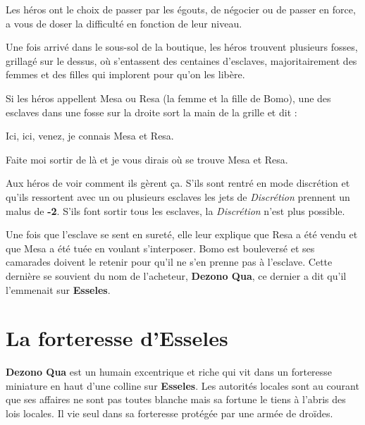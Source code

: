 \documentclass{jdrp}
\begin{document}
	Les héros ont le choix de passer par les égouts, de négocier ou de passer en force, a vous de doser la difficulté en fonction de leur niveau.

	Une fois arrivé dans le sous-sol de la boutique, les héros trouvent plusieurs fosses, grillagé sur le dessus, où s’entassent des centaines d’esclaves, majoritairement des femmes et des filles qui implorent pour qu'on les libère.

	Si les héros appellent Mesa ou Resa (la femme et la fille de Bomo), une des esclaves dans une fosse sur la droite sort la main de la grille et dit :

	\begin{quotebox}
    	Ici, ici, venez, je connais Mesa et Resa.

    	Faite moi sortir de là et je vous dirais où se trouve Mesa et Resa.
	\end{quotebox}
	Aux héros de voir comment ils gèrent ça. S’ils sont rentré en mode discrétion et qu’ils ressortent avec un ou plusieurs esclaves les jets de \textit{Discrétion} prennent un malus de \textbf{-2}. S’ils font sortir tous les esclaves, la \textit{Discrétion} n’est plus possible.

	Une fois que l’esclave se sent en sureté, elle leur explique que Resa a été vendu et que Mesa a été tuée en voulant s’interposer. Bomo est bouleversé et ses camarades doivent le retenir pour qu’il ne s’en prenne pas à l’esclave. Cette dernière se souvient du nom de l’acheteur, \textbf{Dezono Qua}, ce dernier a dit qu’il l’emmenait sur \textbf{Esseles}.

	\section{La forteresse d’Esseles}
	\textbf{Dezono Qua} est un humain excentrique et riche qui vit dans un forteresse miniature en haut d’une colline sur \textbf{Esseles}. Les autorités locales sont au courant que ses affaires ne sont pas toutes blanche mais sa fortune le tiens à l’abris des lois locales. Il vie seul dans sa forteresse protégée par une armée de droïdes.\\ 
\end{document}
